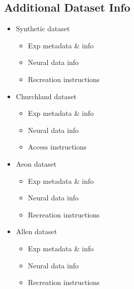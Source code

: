 \subsection{Additional Dataset Info}
\label{subsection:additional_dataset_info}

\begin{itemize}
    \item Synthetic dataset
    \begin{itemize}
        \item Exp metadata \& info
        \item Neural data info
        \item Recreation instructions
    \end{itemize}
    
    \item Churchland dataset
    \begin{itemize}
        \item Exp metadata \& info
        \item Neural data info
        \item Access instructions
    \end{itemize}
    
    \item Aeon dataset
    \begin{itemize}
        \item Exp metadata \& info
        \item Neural data info
        \item Recreation instructions
    \end{itemize}
    
    \item Allen dataset
    \begin{itemize}
        \item Exp metadata \& info
        \item Neural data info
        \item Recreation instructions
    \end{itemize}
\end{itemize}